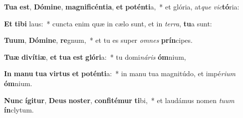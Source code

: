 \item \textbf{Tu}\textbf{a} \textbf{est}, \textbf{Dó}\textbf{mi}\textbf{ne}, \textbf{ma}\textbf{gni}\textbf{fi}\textbf{cén}\textbf{ti}\textbf{a}, \textbf{et} \textbf{pot}\textbf{én}\textbf{ti}a,~* et glória, at\textit{que} \textit{vic}\textbf{tó}ria:
\item \textbf{Et} \textbf{ti}\textbf{bi} laus:~* cuncta enim quæ in cælo sunt, et in \textit{ter}\textit{ra}, \textbf{tu}a sunt:
\item \textbf{Tu}\textbf{um}, \textbf{Dó}\textbf{mi}\textbf{ne}, \textbf{re}gnum,~* et tu es super \textit{om}\textit{nes} \textbf{prín}cipes.
\item \textbf{Tu}\textbf{æ} \textbf{di}\textbf{ví}\textbf{ti}\textbf{æ}, \textbf{et} \textbf{tu}\textbf{a} \textbf{est} \textbf{gló}\textbf{ri}a:~* tu domi\textit{ná}\textit{ris} \textbf{óm}nium,
\item \textbf{In} \textbf{ma}\textbf{nu} \textbf{tu}\textbf{a} \textbf{vir}\textbf{tus} \textbf{et} \textbf{pot}\textbf{én}\textbf{ti}a:~* in manu tua magnitúdo, et impé\textit{ri}\textit{um} \textbf{óm}nium.
\item \textbf{Nunc} \textbf{í}\textbf{gi}\textbf{tur}, \textbf{De}\textbf{us} \textbf{nos}\textbf{ter}, \textbf{con}\textbf{fi}\textbf{té}\textbf{mur} \textbf{ti}bi,~* et laudámus nomen \textit{tu}\textit{um} \textbf{ín}clytum.
